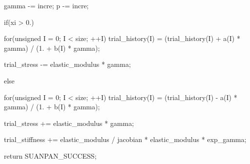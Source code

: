 \begin{cppcode}
{{        gamma -= incre;
        p -= incre;
    }

    if(xi > 0.) {
        for(unsigned I = 0; I < size; ++I) trial_history(I) = (trial_history(I) + a(I) * gamma) / (1. + b(I) * gamma);

        trial_stress -= elastic_modulus * gamma;
    }
    else {
        for(unsigned I = 0; I < size; ++I) trial_history(I) = (trial_history(I) - a(I) * gamma) / (1. + b(I) * gamma);

        trial_stress += elastic_modulus * gamma;
    }

    trial_stiffness += elastic_modulus / jacobian * elastic_modulus * exp_gamma;

    return SUANPAN_SUCCESS;
}
\end{cppcode}